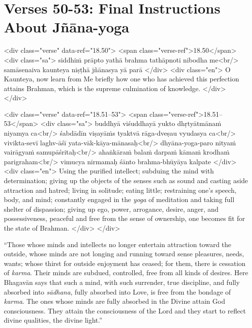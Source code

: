 \newpage
\section{Verses 50-53: Final Instructions About Jñāna-yoga}\label{sec-verses-50-53-final-instructions-about-jnana-yoga}


\begin{html}
<div class="verse" data-ref="18.50">
  <span class="verse-ref">18.50</span>
  <div class="sa">
    siddhiṁ prāpto yathā brahma tathāpnoti nibodha me<br/>
    samāsenaiva kaunteya niṣṭhā jñānasya yā parā
  </div>
  <div class="en">
    O Kaunteya, now learn from Me briefly how one who has achieved this perfection attains Brahman, which is the supreme culmination of knowledge.
  </div>
</div>
\end{html}



\begin{html}
<div class="verse" data-ref="18.51–53">
  <span class="verse-ref">18.51–53</span>
  <div class="sa">
    buddhyā viśuddhayā yukto dhṛtyātmānaṁ niyamya ca<br/>
    śabdādīn viṣayāṁs tyaktvā rāga-dveṣau vyudasya ca<br/>
    vivikta-sevī laghv-āśī yata-vāk-kāya-mānasaḥ<br/>
    dhyāna-yoga-paro nityaṁ vairāgyaṁ samupāśritaḥ<br/>
    ahaṅkāraṁ balaṁ darpaṁ kāmaṁ krodhaṁ parigraham<br/>
    vimucya nirmamaḥ śānto brahma-bhūyāya kalpate
  </div>
  <div class="en">
    Using the purified intellect; subduing the mind with determination; giving up the objects of the senses such as sound and casting aside attraction and hatred; living in solitude; eating little; restraining one's speech, body, and mind; constantly engaged in the \textit{yoga} of meditation and taking full shelter of dispassion; giving up ego, power, arrogance, desire, anger, and possessiveness, peaceful and free from the sense of ownership, one becomes fit for the state of Brahman.
  </div>
</div>
\end{html}


\enquote{Those whose minds and intellects no longer entertain attraction toward the outside, whose minds are not longing and running toward sense pleasures, needs, wants; whose thirst for outside enjoyment has ceased; for them, there is cessation of \textit{karma}. Their minds are subdued, controlled, free from all kinds of desires. Here Bhagavān says that such a mind, with such surrender, true discipline, and fully absorbed into \textit{sādhana}, fully absorbed into Love, is free from the bondage of \textit{karma}. The ones whose minds are fully absorbed in the Divine attain God consciousness. They attain the consciousness of the Lord and they start to reflect divine qualities, the divine light.}

